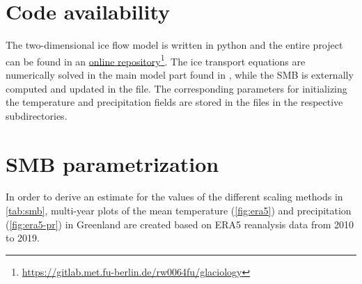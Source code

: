 \section{Code availability}\label{app:code}

The two-dimensional ice flow model is written in python and the entire project can be found in an \href{https://gitlab.met.fu-berlin.de/rw0064fu/glaciology}{online repository}\footnote{\hypersetup{urlcolor=}\url{https://gitlab.met.fu-berlin.de/rw0064fu/glaciology}}. The ice transport equations are numerically solved in the main model part found in , while the SMB is externally computed and updated in the  file. The corresponding parameters for initializing the temperature and precipitation fields are stored in the  files in the respective subdirectories.

\section{SMB parametrization}\label{app:era5}

In order to derive an estimate for the values of the different scaling methods in \cref{tab:smb}, multi-year plots of the mean
temperature (\cref{fig:era5}) and precipitation (\cref{fig:era5-pr}) in Greenland are created based on ERA5 reanalysis data from 2010 to 2019.

